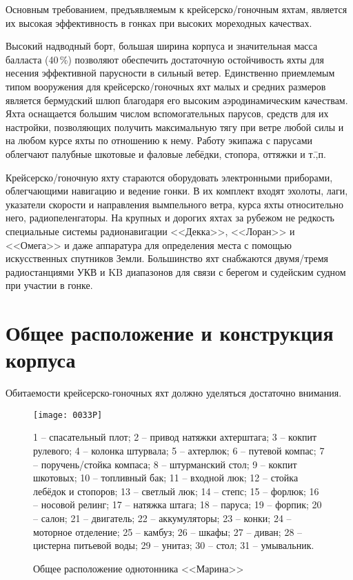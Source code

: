 Основным требованием, предъявляемым к крейсерско\-/гоночным яхтам,
является их высокая эффективность в гонках при высоких мореходных
качествах.

Высокий надводный борт, большая ширина корпуса и значительная масса
балласта (40\,\%) позволяют обеспечить достаточную
остойчивость яхты для несения эффективной парусности в сильный
ветер. Единственно приемлемым типом вооружения для
крейсерско\-/гоночных яхт малых и средних размеров является бермудский
шлюп благодаря его высоким аэродинамическим качествам. Яхта оснащается
большим числом вспомогательных парусов, средств для их настройки,
позволяющих получить максимальную тягу при ветре любой силы и на любом
курсе яхты по отношению к нему. Работу экипажа с парусами облегчают
палубные шкотовые и фаловые лебёдки, стопора, оттяжки и т.\=,п.

Крейсерско\-/гоночную яхту стараются оборудовать электронными
приборами, облегчающими навигацию и ведение гонки. В их комплект
входят эхолоты, лаги, указатели скорости и направления вымпельного
ветра, курса яхты относительно него, радиопеленгаторы. На крупных и
дорогих яхтах за рубежом не редкость специальные системы
радионавигации <<Декка>>, <<Лоран>> и <<Омега>> и даже аппаратура для
определения места с помощью искусственных спутников Земли. Большинство
яхт снабжаются двумя\-/тремя радиостанциями УКВ и KB диапазонов для
связи с берегом и судейским судном при участии в гонке.

\section{Общее расположение и конструкция корпуса}

Обитаемости крейсерско-гоночных яхт должно уделяться достаточно внимания.

\begin{figure*}[htb]
  \centering
  \texttt{[image: 0033P]}
  \caption{Общее расположение однотонника <<Марина>>}
  \label{fig:33}
  \small
  \centering{}
  1 \--- спасательный плот; 2 \--- привод натяжки ахтерштага; 3 \--- кокпит рулевого; 4 \--- колонка штурвала; 5 \--- ахтерлюк; 6 \--- путевой компас; 7 \--- поручень\-/стойка компаса; 8 \--- штурманский стол; 9 \--- кокпит шкотовых; 10 \--- топливный бак; 11 \--- входной люк; 12 \--- стойка лебёдок и стопоров; 13 \--- светлый люк; 14 \--- степс; 15 \--- форлюк; 16 \--- носовой релинг; 17 \--- натяжка штага; 18 \--- паруса; 19 \--- форпик; 20 \--- салон; 21 \--- двигатель; 22 \--- аккумуляторы; 23 \--- конки; 24 \--- моторное отделение; 25 \--- камбуз; 26 \--- шкафы; 27 \--- диван; 28 \--- цистерна питьевой воды; 29 \--- унитаз; 30 \--- стол; 31 \--- умывальник. 
\end{figure*}

